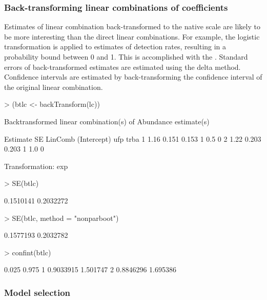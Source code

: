 \documentclass[article,shortnames]{jss}
\begin{document}
\subsubsection{Back-transforming linear combinations of coefficients}

Estimates of linear combination back-transformed to the native scale
are likely to be more interesting than the direct linear combinations.
For example, the logistic transformation is applied to estimates of
detection rates, resulting in a probability bound between 0 and
1. This is accomplished with the .  Standard
errors of back-transformed estimates are estimated using the delta
method.  Confidence intervals are estimated by back-transforming the
confidence interval of the original linear combination.

\begin{Schunk}
\begin{Sinput}
> (btlc <- backTransform(lc))
\end{Sinput}
\begin{Soutput}
Backtransformed linear combination(s) of Abundance estimate(s)

  Estimate    SE LinComb (Intercept) ufp trba
1     1.16 0.151   0.153           1 0.5    0
2     1.22 0.203   0.203           1 1.0    0

Transformation: exp 
\end{Soutput}
\begin{Sinput}
> SE(btlc)
\end{Sinput}
\begin{Soutput}
[1] 0.1510141 0.2032272
\end{Soutput}
\begin{Sinput}
> SE(btlc, method = "nonparboot")
\end{Sinput}
\begin{Soutput}
[1] 0.1577193 0.2032782
\end{Soutput}
\begin{Sinput}
> confint(btlc)
\end{Sinput}
\begin{Soutput}
      0.025    0.975
1 0.9033915 1.501747
2 0.8846296 1.695386
\end{Soutput}
\end{Schunk}


\subsubsection{Model selection}
\end{document}

